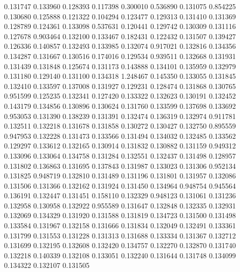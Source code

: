 0.131747
0.133960
0.128393
0.117398
0.300010
0.536890
0.131075
0.854225
0.130680
0.125888
0.121322
0.104294
0.123477
0.129313
0.131410
0.131369
0.128789
0.124361
0.133098
0.537631
0.120441
0.129742
0.130309
0.131116
0.127678
0.903464
0.132100
0.133467
0.182431
0.122432
0.131507
0.139427
0.126336
0.140857
0.132493
0.133985
0.132074
0.917021
0.132816
0.134356
0.134287
0.131667
0.130516
0.174016
0.129534
0.939511
0.132668
0.131931
0.131439
0.131848
0.125674
0.131173
0.143888
0.134101
0.135959
0.132979
0.131180
0.129140
0.131100
0.134318
1.248467
0.145350
0.133055
0.131845
0.132410
0.133597
0.137008
0.131927
0.129231
0.128474
0.131868
0.130765
0.951599
0.125235
0.132341
0.127420
0.133322
0.132623
0.130191
0.132452
0.143179
0.134856
0.130896
0.130624
0.131760
0.133599
0.137698
0.133692
0.953053
0.131390
0.138239
0.131391
0.132474
0.136319
0.132974
0.911781
0.132511
0.132218
0.131678
0.131858
0.130272
0.130427
0.132750
0.895559
0.947953
0.132228
0.131473
0.133566
0.131494
0.134032
0.132485
0.133562
0.129297
0.133612
0.132165
0.130914
0.131832
0.130882
0.131159
0.949312
0.133096
0.133064
0.134758
0.131284
0.132551
0.132437
0.131498
0.128957
0.131802
0.136863
0.131695
0.137843
0.131987
0.133023
0.131306
0.952134
0.131825
0.948719
0.132810
0.131489
0.131196
0.131801
0.131957
0.132086
0.131506
0.131366
0.132162
0.131924
0.131450
0.134964
0.948754
0.945564
0.136191
0.132447
0.131451
0.158110
0.132329
0.948123
0.131061
0.131236
0.132958
0.130958
0.132922
0.955589
0.131647
0.132848
0.132335
0.132931
0.132069
0.134329
0.131920
0.131588
0.131819
0.134723
0.131500
0.131498
0.133584
0.131967
0.132158
0.131666
0.131834
0.132049
0.132491
0.133361
0.131799
0.131553
0.131228
0.131313
0.131688
0.133334
0.131367
0.132712
0.131699
0.132195
0.132608
0.132420
0.134757
0.132270
0.132870
0.131740
0.132218
0.140339
0.132108
0.133051
0.132240
0.131644
0.131748
0.134099
0.134322
0.132107
0.131505
